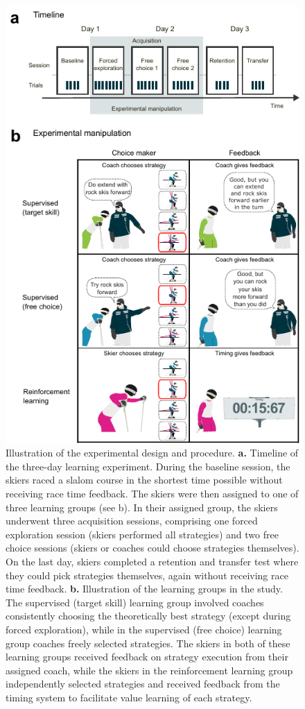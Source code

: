 \documentclass[pdflatex,sn-nature]{sn-jnl}%
\theoremstyle{thmstyleone}%
\theoremstyle{thmstyletwo}%
\theoremstyle{thmstylethree}%
\begin{document}
\begin{figure}[H]
\centering
\includegraphics{figures/figure_method_experiment2.pdf}
\caption{Illustration of the experimental design and procedure. \textbf{a.} Timeline of the three-day learning experiment. During the baseline session, the skiers raced a slalom course in the shortest time possible without receiving race time feedback. The skiers were then assigned to one of three learning groups (see b). In their assigned group, the skiers underwent three acquisition sessions, comprising one forced exploration session (skiers performed all strategies) and two free choice sessions (skiers or coaches could choose strategies themselves). On the last day, skiers completed a retention and transfer test where they could pick strategies themselves, again without receiving race time feedback. \textbf{b.} Illustration of the learning groups in the study. The supervised (target skill) learning group involved coaches consistently choosing the theoretically best strategy (except during forced exploration), while in the supervised (free choice) learning group coaches freely selected strategies. The skiers in both of these learning groups received feedback on strategy execution from their assigned coach, while the skiers in the reinforcement learning group independently selected strategies and received feedback from the timing system to facilitate value learning of each strategy.}
\label{fig:experiment}
\end{figure}
\end{document}
